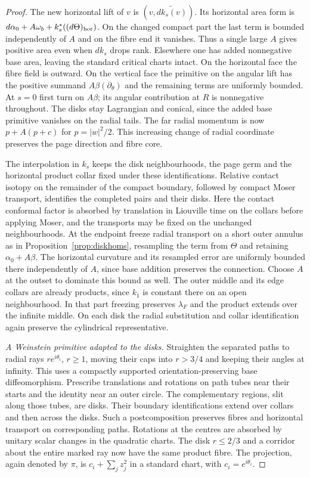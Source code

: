 \begin{proof}
The new horizontal lift of $v$ is $(v,\widetilde{dk_s(v)})$. Its horizontal area form is $d\alpha_0+A\omega_b+k_s^*((d\Theta)_{\rm hor})$. On the changed compact part the last term is bounded independently of $A$ and on the fibre end it vanishes. Thus a single large $A$ gives positive area even when $dk_s$ drops rank. Elsewhere one has added nonnegative base area, leaving the standard critical charts intact. On the horizontal face the fibre field is outward. On the vertical face the primitive on the angular lift has the positive summand $A\beta(\partial_\theta)$ and the remaining terms are uniformly bounded. At $s=0$ first turn on $A\beta$; its angular contribution at $R$ is nonnegative throughout. The disks stay Lagrangian and conical, since the added base primitive vanishes on the radial tails. The far radial momentum is now $p+A(p+c)$ for $p=|w|^2/2$. This increasing change of radial coordinate preserves the page direction and fibre core.

The interpolation in $k_s$ keeps the disk neighbourhoods, the page germ and the horizontal product collar fixed under these identifications. Relative contact isotopy on the remainder of the compact boundary, followed by compact Moser transport, identifies the completed pairs and their disks. Here the contact conformal factor is absorbed by translation in Liouville time on the collars before applying Moser, and the transports may be fixed on the unchanged neighbourhoods. At the endpoint freeze radial transport on a short outer annulus as in Proposition~\ref{prop:diskhoms}, resampling the term from $\Theta$ and retaining $\alpha_0+A\beta$. The horizontal curvature and its resampled error are uniformly bounded there independently of $A$, since base addition preserves the connection. Choose $A$ at the outset to dominate this bound as well. The outer middle and its edge collars are already products, since $k_1$ is constant there on an open neighbourhood. In that part freezing preserves $\lambda_F$ and the product extends over the infinite middle. On each disk the radial substitution and collar identification again preserve the cylindrical representative.

\medskip
\noindent\emph{A Weinstein primitive adapted to the disks.}
Straighten the separated paths to radial rays $r e^{i\theta_i}$, $r\ge1$, moving their caps into $r>3/4$ and keeping their angles at infinity. This uses a compactly supported orientation-preserving base diffeomorphism. Prescribe translations and rotations on path tubes near their starts and the identity near an outer circle. The complementary regions, slit along those tubes, are disks. Their boundary identifications extend over collars and then across the disks. Such a postcomposition preserves fibres and horizontal transport on corresponding paths. Rotations at the centres are absorbed by unitary scalar changes in the quadratic charts. The disk $r\le2/3$ and a corridor about the entire marked ray now have the same product fibre. The projection, again denoted by $\pi$, is $c_i+\sum_jz_j^2$ in a standard chart, with $c_i=e^{i\theta_i}$.


\end{proof}
